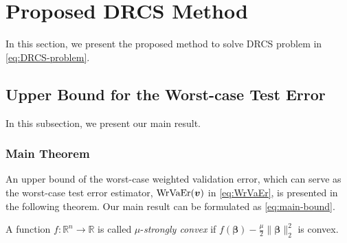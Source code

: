 \section{Proposed DRCS Method}
\label{sec:method}

%
In this section, we present the proposed method to solve DRCS problem in \eqref{eq:DRCS-problem}.

\subsection{Upper Bound for the Worst-case Test Error}
\label{subsec:UB_WC}
%
In this subsection, we present our main result.

\subsubsection{Main Theorem}
%
An upper bound of the worst-case weighted validation error, which can serve as the worst-case test error estimator, $ {\rm WrVaEr}(\bm v) $ in \eqref{eq:WrVaEr}, is presented in the following theorem. Our main result can be formulated as \eqref{eq:main-bound}.

\begin{definition}
\end{definition}

\begin{definition}
A function $f:\mathbb{R}^n\to\mathbb{R}$ is called $\mu$-{\em strongly convex} if $f(\bm\beta) - \frac{\mu}{2}\|\bm\beta\|_2^2$ is convex.
\end{definition}

